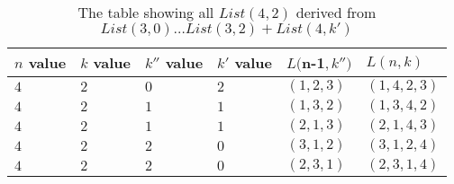 \begin{table}
  \begin{tabular}{|p{2cm}||p{2cm}||p{2cm}||p{2cm} ||p{2cm} ||p{2cm}||}
     \hline
        \small{$n$ value}& \small{$k$ value} & \small{$k''$ value} & \small{$k'$ value} &\small{$L($n-1$, k'')$} & \small{$L(n, k)$}\\
        \hline
        \small{$4$} & \small{$2$} & \small{$0$} & \small{$2$} & \small{$(1,2,3)$} & \small{$(1,4,2,3)$} \\
        \hline
        \small{$4$} & \small{$2$} & \small{$1$} & \small{$1$} & \small{$(1,3,2)$} & \small{$(1,3,4,2)$} \\
        \small{$4$} & \small{$2$} & \small{$1$} & \small{$1$} & \small{$(2,1,3)$} & \small{$(2,1,4,3)$} \\
        \hline
        \small{$4$} & \small{$2$} & \small{$2$} & \small{$0$} & \small{$(3,1,2)$} & \small{$(3,1,2,4)$} \\                
        \small{$4$} & \small{$2$} & \small{$2$} & \small{$0$} & \small{$(2,3,1)$} & \small{$(2,3,1,4)$} \\
        \hline
  \end{tabular}
  \caption{The table showing all $List(4, 2)$ derived from $List(3, 0) \dots List(3, 2) + List(4, k')$}
  \label{Table:List4,2}
\end{table}


